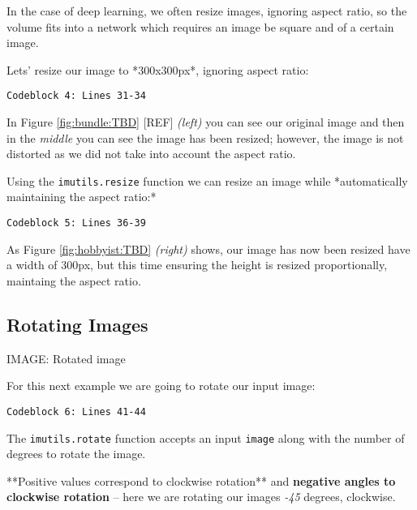 In the case of deep learning, we often resize images, ignoring aspect ratio, so the volume fits into a network which requires an image be square and of a certain image.

Lets’ resize our image to *300x300px*, ignoring aspect ratio:

\begin{verbatim}
Codeblock 4: Lines 31-34
\end{verbatim}

In Figure \ref{fig:bundle:TBD} [REF] \textit{(left)} you can see our original image and then in the \textit{middle} you can see the image has been resized; however, the image is not distorted as we did not take into account the aspect ratio.

Using the \texttt{imutils.resize} function we can resize an image while *automatically maintaining the aspect ratio:*

\begin{verbatim}
Codeblock 5: Lines 36-39
\end{verbatim}

As Figure \ref{fig:hobbyist:TBD} \textit{(right)} shows, our image has now been resized have a width of 300px, but this time ensuring the height is resized proportionally, maintaing the aspect ratio.


\subsection{Rotating Images}

IMAGE: Rotated image

For this next example we are going to rotate our input image:

\begin{verbatim}
Codeblock 6: Lines 41-44
\end{verbatim}

The \texttt{imutils.rotate} function accepts an input \texttt{image} along with the number of degrees to rotate the image.

**Positive values correspond to clockwise rotation** and \textbf{negative angles to clockwise rotation} -- here we are rotating our images \textit{-45} degrees, clockwise.

